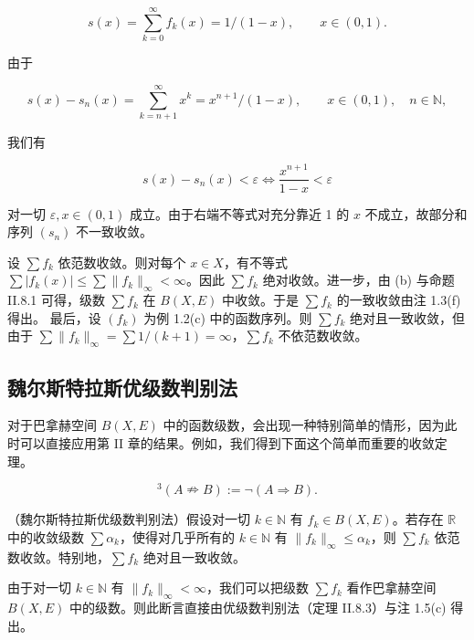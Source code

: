 \begin{remark}
\begin{subitems}
\[
s(x)=\sum_{k=0}^{\infty}f_{k}(x)=1/(1-x),\qquad x\in(0,1).
\]

由于

\[
s(x)-s_{n}(x)=\sum_{k=n+1}^{\infty}x^{k}=x^{n+1}/(1-x),\qquad x\in(0,1),\quad n\in\mathbb{N},
\]

我们有

\[
s(x)-s_{n}(x)<\varepsilon\Longleftrightarrow\frac{x^{n+1}}{1-x}<\varepsilon
\]

对一切 $ \varepsilon, x \in (0,1) $ 成立。由于右端不等式对充分靠近 1 的 $ x $ 不成立，故部分和序列 $ (s_n) $ 不一致收敛。

\item[（iii）]

设 $\sum f_k$ 依范数收敛。则对每个 $ x \in X $，有不等式 $\sum |f_k(x)| \leq \sum \|f_k\|_\infty < \infty$。因此 $\sum f_k$ 绝对收敛。进一步，由 (b) 与命题 II.8.1 可得，级数 $\sum f_k$ 在 $ B(X, E) $ 中收敛。于是 $\sum f_k$ 的一致收敛由注 1.3(f) 得出。
最后，设 $(f_k)$ 为例 1.2(c) 中的函数序列。则 $\sum f_k$ 绝对且一致收敛，但由于 $\sum \|f_k\|_\infty = \sum 1/(k+1) = \infty$，$\sum f_k$ 不依范数收敛。

\end{subitems}

\end{remark}

\subsection*{魏尔斯特拉斯优级数判别法}

对于巴拿赫空间 $ B(X, E) $ 中的函数级数，会出现一种特别简单的情形，因为此时可以直接应用第 II 章的结果。例如，我们得到下面这个简单而重要的收敛定理。

\[
{}^{3}(A\nRightarrow B):=\neg(A\Rightarrow B).
\]

\begin{theorem}

（魏尔斯特拉斯优级数判别法）假设对一切 $ k \in \mathbb{N} $ 有 $ f_k \in B(X, E) $。若存在 $ \mathbb{R} $ 中的收敛级数 $ \sum \alpha_k $，使得对几乎所有的 $ k \in \mathbb{N} $ 有 $ \|f_k\|_\infty \leq \alpha_k $，则 $ \sum f_k $ 依范数收敛。特别地，$ \sum f_k $ 绝对且一致收敛。

\proofhead
由于对一切 $ k \in \mathbb{N} $ 有 $\|f_k\|_\infty < \infty$，我们可以把级数 $\sum f_k$ 看作巴拿赫空间 $ B(X, E) $ 中的级数。则此断言直接由优级数判别法（定理 II.8.3）与注 1.5(c) 得出。
\end{theorem}

